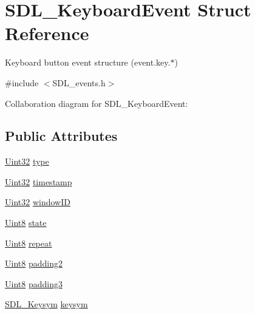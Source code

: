 \hypertarget{struct_s_d_l___keyboard_event}{\section{S\-D\-L\-\_\-\-Keyboard\-Event Struct Reference}
\label{struct_s_d_l___keyboard_event}
}


Keyboard button event structure (event.\-key.$\ast$)  




{\ttfamily \#include $<$S\-D\-L\-\_\-events.\-h$>$}



Collaboration diagram for S\-D\-L\-\_\-\-Keyboard\-Event\-:
\subsection*{Public Attributes}
\begin{DoxyCompactItemize}
\item 
\hyperlink{_s_d_l__stdinc_8h_add440eff171ea5f55cb00c4a9ab8672d}{Uint32} \hyperlink{struct_s_d_l___keyboard_event_ae0b2f2aace6f80c1f47e5a14350d409a}{type}
\item 
\hyperlink{_s_d_l__stdinc_8h_add440eff171ea5f55cb00c4a9ab8672d}{Uint32} \hyperlink{struct_s_d_l___keyboard_event_a3da1d8f6892e7f6ee28d9eafdb5e7d02}{timestamp}
\item 
\hyperlink{_s_d_l__stdinc_8h_add440eff171ea5f55cb00c4a9ab8672d}{Uint32} \hyperlink{struct_s_d_l___keyboard_event_a56efb6780b96acd5b50d8f797efb3546}{window\-I\-D}
\item 
\hyperlink{_s_d_l__stdinc_8h_a2944638813a090aa23e62f4da842c3e2}{Uint8} \hyperlink{struct_s_d_l___keyboard_event_a110558eb96c113c86cfa31a7018c2346}{state}
\item 
\hyperlink{_s_d_l__stdinc_8h_a2944638813a090aa23e62f4da842c3e2}{Uint8} \hyperlink{struct_s_d_l___keyboard_event_a3edac3b36304812d533795c9df4ed4c1}{repeat}
\item 
\hyperlink{_s_d_l__stdinc_8h_a2944638813a090aa23e62f4da842c3e2}{Uint8} \hyperlink{struct_s_d_l___keyboard_event_ae270122f757f76171318294afd2c95e6}{padding2}
\item 
\hyperlink{_s_d_l__stdinc_8h_a2944638813a090aa23e62f4da842c3e2}{Uint8} \hyperlink{struct_s_d_l___keyboard_event_ae1831035ef556a7b09efcd2469f26f7a}{padding3}
\item 
\hyperlink{struct_s_d_l___keysym}{S\-D\-L\-\_\-\-Keysym} \hyperlink{struct_s_d_l___keyboard_event_a2a57ba820a298f2c02ad5d41fd2b1aa8}{keysym}
\end{DoxyCompactItemize}


